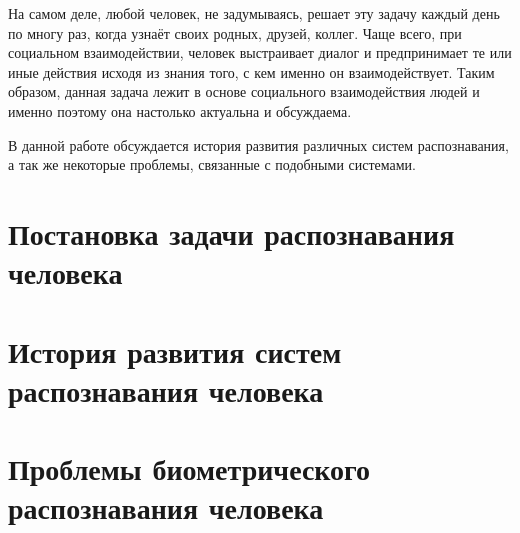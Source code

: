 \documentclass[14pt, a4paper]{extarticle}
\begin{document}
На самом деле, любой человек, не задумываясь, решает эту задачу каждый день по многу раз, когда узнаёт своих родных, друзей, коллег. Чаще всего, при социальном взаимодействии, человек выстраивает диалог и предпринимает те или иные действия исходя из знания того, с кем именно он взаимодействует. Таким образом, данная задача лежит в основе социального взаимодействия людей и именно поэтому она настолько актуальна и обсуждаема.

В данной работе обсуждается история развития различных систем распознавания, а так же некоторые проблемы, связанные с подобными системами.

\section{Постановка задачи распознавания человека}
\section{История развития систем распознавания человека}
\section{Проблемы биометрического распознавания человека}
	
\newpage

	
\end{document}
